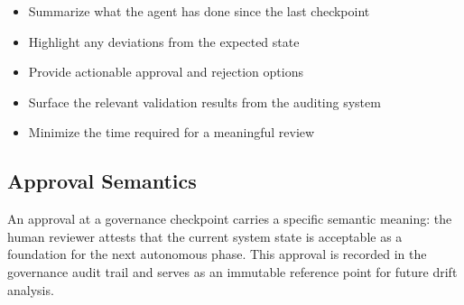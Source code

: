 \begin{itemize}
  \item Summarize what the agent has done since the last checkpoint
  \item Highlight any deviations from the expected state
  \item Provide actionable approval and rejection options
  \item Surface the relevant validation results from the auditing system
  \item Minimize the time required for a meaningful review
\end{itemize}

\subsection{Approval Semantics}

An approval at a governance checkpoint carries a specific semantic meaning: the human
reviewer attests that the current system state is acceptable as a foundation for the
next autonomous phase. This approval is recorded in the governance audit trail and
serves as an immutable reference point for future drift analysis.
